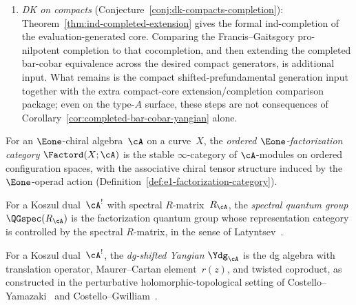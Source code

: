 \begin{remark}
\begin{enumerate}[label=\textup{(\roman*)}]
\item \emph{DK on compacts}
 \textup{(}Conjecture~\ref{conj:dk-compacts-completion}\textup{)}:
 Theorem~\ref{thm:ind-completed-extension} gives the formal
 ind-completion of the evaluation-generated core. Comparing the
 Francis--Gaitsgory pro-nilpotent completion to that cocompletion,
 and then extending the completed bar-cobar equivalence across the
 desired compact generators, is additional input. What remains is
 the compact shifted-prefundamental generation input together with
 the extra compact-core extension/completion comparison package;
 even on the type-$A$ surface, these steps are not consequences of
 Corollary~\ref{cor:completed-bar-cobar-yangian} alone.
\end{enumerate}
\end{remark}

\begin{definition}
\label{def:ordered-e1-factorization}
For an $\Eone$-chiral algebra~$\cA$ on a curve~$X$,
the \emph{ordered $\Eone$-factorization category}
$\Factord(X;\cA)$ is the stable $\infty$-category
of $\cA$-modules on ordered configuration spaces,
with the associative chiral tensor structure induced
by the $\Eone$-operad action
(Definition~\ref{def:e1-factorization-category}).
\end{definition}

\begin{definition}
\label{def:spectral-quantum-group}
For a Koszul dual~$\cA^!$ with spectral $R$-matrix~$R_{\cA}$,
the \emph{spectral quantum group} $\QGspec(R_{\cA})$ is the
factorization quantum group whose representation category
is controlled by the spectral $R$-matrix, in the sense of
Latyntsev~\cite{Latyntsev23}.
\end{definition}

\begin{definition}
\label{def:dg-shifted-yangian}
For a Koszul dual~$\cA^!$, the \emph{dg-shifted Yangian}
$\Ydg_{\cA}$ is the dg algebra with translation operator,
Maurer--Cartan element~$r(z)$, and twisted coproduct,
as constructed in the perturbative holomorphic-topological
setting of Costello--Yamazaki~\cite{costello-yamazaki} and
Costello--Gwilliam~\cite{CG17}.
\end{definition}

